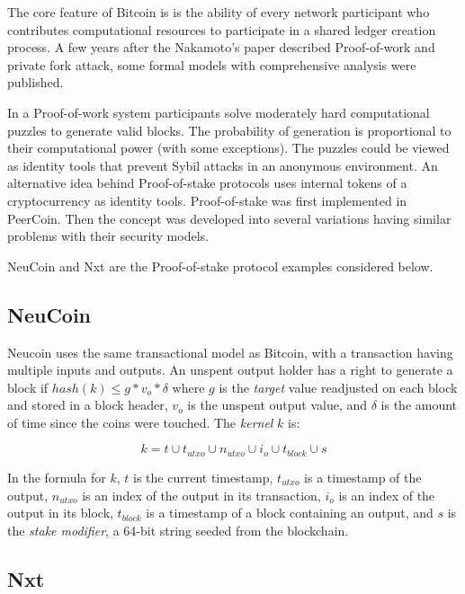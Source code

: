 \documentclass[preprint,review,3p,times,twocolumn]{elsarticle}
\begin{document}
The core feature of Bitcoin is is the ability of every network participant who contributes computational resources to participate in a shared ledger creation process. A few years after the Nakamoto's paper\cite{Nakamoto2008} described Proof-of-work and  private fork attack, some formal models with comprehensive analysis were published\cite{Garay2015,Miller2014a}.	

In a Proof-of-work system participants solve moderately hard computational puzzles\cite{Miller2014a} to generate valid blocks. The probability of generation is proportional to their computational power (with some exceptions\cite{Eyal2014,Garay2015}). The puzzles could be viewed as identity tools that prevent Sybil attacks in an anonymous environment. An alternative idea behind Proof-of-stake protocols uses internal tokens of a cryptocurrency as identity tools. Proof-of-stake was first implemented in PeerCoin\cite{King2012}. Then the concept was developed into several variations having similar problems with their security models.

NeuCoin\cite{Davarpanah2015} and Nxt are the Proof-of-stake protocol examples considered below.

\subsection{NeuCoin}

Neucoin uses the same transactional model as Bitcoin, with a transaction having multiple inputs and outputs. An unspent output holder has a right to generate a block if \(hash(k) \leqslant g*v_o*\delta\) where 
\(g\) is the \textit{target} value readjusted on each block and stored in a block header, \(v_o\) is the unspent output value, and \(\delta\) is the amount of time since the coins were touched. The \textit{kernel} \(k\) is:

\begin{equation}\label{eq:1} k = t \cup t_{utxo} \cup n_{utxo} \cup i_o \cup t_{block} \cup s\end{equation}

In the formula for \(k\), \(t\) is the current timestamp, \(t_{utxo}\) is a timestamp of the output, \(n_{utxo}\) is an index of the output in its transaction, \(i_o\) is an index of the output in its block, 
\(t_{block}\) is a timestamp of a block containing an output, and \(s\) is the \textit{stake modifier}, a 64-bit string seeded from the blockchain. 

\subsection{Nxt}
\end{document}
